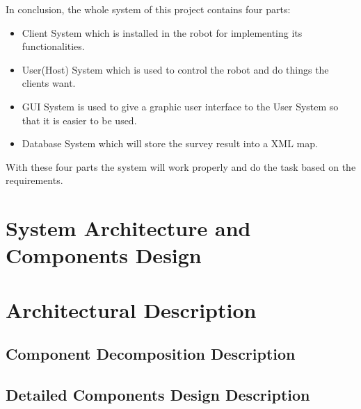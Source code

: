 \documentclass[11pt, a4paper]{report}
\begin{document}
\newline
In conclusion, the whole system of this project contains four parts:
\begin{itemize}
  \item Client System which is installed in the robot for implementing its functionalities.
  \item User(Host) System which is used to control the robot and do things the clients want.
  \item GUI System is used to give a graphic user interface to the User System so that it is easier to be used.
  \item Database System which will store the survey result into a XML map.
\end{itemize}
With these four parts the system will work properly and do the task based on the requirements.



\pagebreak


\chapter{System Architecture and Components Design}%
\label{cha:SACD}


\chapter{Architectural Description}


\section{Component Decomposition Description}


\section{Detailed Components Design Description}
\end{document}
